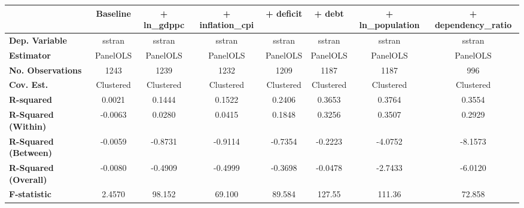 \begin{center}
\begin{tabular}{lccccccc}
\toprule
                                   & \textbf{Baseline} & \textbf{+ ln\_gdppc} & \textbf{+ inflation\_cpi} & \textbf{+ deficit} & \textbf{+ debt} & \textbf{+ ln\_population} & \textbf{+ dependency\_ratio}  \\
\midrule
\textbf{Dep. Variable}             &       sstran      &        sstran        &           sstran          &       sstran       &      sstran     &           sstran          &            sstran             \\
\textbf{Estimator}                 &      PanelOLS     &       PanelOLS       &          PanelOLS         &      PanelOLS      &     PanelOLS    &          PanelOLS         &           PanelOLS            \\
\textbf{No. Observations}          &        1243       &         1239         &            1232           &        1209        &       1187      &            1187           &             996               \\
\textbf{Cov. Est.}                 &     Clustered     &      Clustered       &         Clustered         &     Clustered      &    Clustered    &         Clustered         &          Clustered            \\
\textbf{R-squared}                 &       0.0021      &        0.1444        &           0.1522          &       0.2406       &      0.3653     &           0.3764          &            0.3554             \\
\textbf{R-Squared (Within)}        &      -0.0063      &        0.0280        &           0.0415          &       0.1848       &      0.3256     &           0.3507          &            0.2929             \\
\textbf{R-Squared (Between)}       &      -0.0059      &       -0.8731        &          -0.9114          &      -0.7354       &     -0.2223     &          -4.0752          &           -8.1573             \\
\textbf{R-Squared (Overall)}       &      -0.0080      &       -0.4909        &          -0.4999          &      -0.3698       &     -0.0478     &          -2.7433          &           -6.0120             \\
\textbf{F-statistic}               &       2.4570      &        98.152        &           69.100          &       89.584       &      127.55     &           111.36          &            72.858             \\

\end{tabular}
\end{center}
